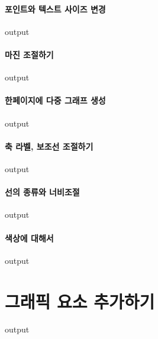 \documentclass{report}
\begin{document}
\paragraph{포인트와 텍스트 사이즈 변경}
\begin{Schunk}
\begin{Soutput}
output
\end{Soutput}
\end{Schunk}
\paragraph{마진 조절하기}
\begin{Schunk}
\begin{Soutput}
output
\end{Soutput}
\end{Schunk}
\paragraph{한페이지에 다중 그래프 생성}
\begin{Schunk}
\begin{Soutput}
output
\end{Soutput}
\end{Schunk}
\paragraph{축 라벨, 보조선 조절하기}
\begin{Schunk}
\begin{Soutput}
output
\end{Soutput}
\end{Schunk}
\paragraph{선의 종류와 너비조절}
\begin{Schunk}
\begin{Soutput}
output
\end{Soutput}
\end{Schunk}
\paragraph{색상에 대해서}
\begin{Schunk}
\begin{Soutput}
output
\end{Soutput}
\end{Schunk}


\section{그래픽 요소 추가하기}
\begin{Schunk}
\begin{Soutput}
output
\end{Soutput}
\end{Schunk}
\end{document}
